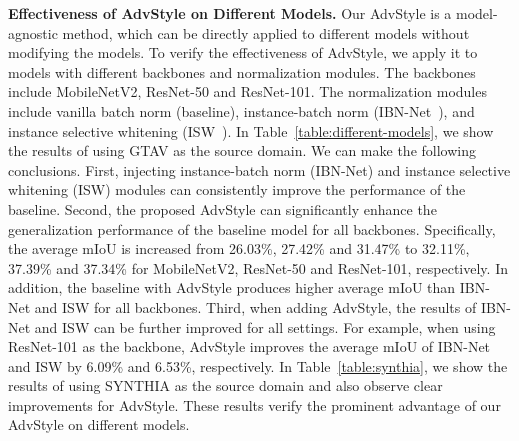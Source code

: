 \documentclass{article}
\newcommand{\ours}{AdvStyle\xspace}
\begin{document}
\textbf{Effectiveness of \ours on Different Models.} Our \ours is a model-agnostic method, which can be directly applied to different models without modifying the models. To verify the effectiveness of \ours, we apply it to models with different backbones and normalization modules. The backbones include MobileNetV2, ResNet-50 and ResNet-101. The normalization modules include vanilla batch norm (baseline), instance-batch norm (IBN-Net~\cite{ibn}), and instance selective whitening (ISW~\cite{robustnet}).
In Table~\ref{table:different-models}, we show the results of using GTAV as the source domain. 
We can make the following conclusions. First, injecting instance-batch norm (IBN-Net) and instance selective whitening (ISW) modules can consistently improve the performance of the baseline. Second, the proposed \ours can significantly enhance the generalization performance of the baseline model for all backbones. Specifically, the average mIoU is increased from 26.03\%, 27.42\% and 31.47\% to 32.11\%, 37.39\% and 37.34\% for MobileNetV2, ResNet-50 and ResNet-101, respectively. In addition, the baseline with \ours produces higher average mIoU than IBN-Net and ISW for all backbones. Third, when adding \ours, the results of IBN-Net and ISW can be further improved for all settings. For example, when using ResNet-101 as the backbone, \ours improves the average mIoU of IBN-Net and ISW by 6.09\% and 6.53\%, respectively. In Table~\ref{table:synthia}, we show the results of using SYNTHIA as the source domain and also observe clear improvements for \ours. These results verify the prominent advantage of our \ours on different models.
\end{document}
